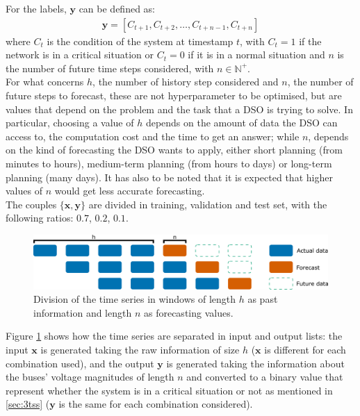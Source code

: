 \noindent For the labels, $\textbf{y}$ can be defined as: 
\begin{equation} \label{eq:labels}
    \begin{aligned}
        \textbf{y} = [C_{t+1},C_{t+2}, \dots, C_{t+n-1},C_{t+n}]
    \end{aligned}
\end{equation}
\noindent where $C_t$ is the condition of the system at timestamp $t$, with $C_t=1$ if the network is in a critical situation or $C_t=0$ if it is in a normal situation and $n$ is the number of future time steps considered, with $n \in \mathbb{N}^+$. \\

For what concerns $h$, the number of history step considered and $n$, the number of future steps to forecast, these are not hyperparameter to be optimised, but are values that depend on the problem and the task that a \gls{DSO} is trying to solve. In particular, choosing a value of $h$ depends on the amount of data the \gls{DSO} can access to, the computation cost and the time to get an answer; while $n$, depends on the kind of forecasting the \gls{DSO} wants to apply, either short planning (from minutes to hours), medium-term planning (from hours to days) or long-term planning (many days). It has also to be noted that it is expected that higher values of $n$ would get less accurate forecasting.\\

The couples $\{\textbf{x},\textbf{y}\}$ are divided in training, validation and test set, with the following ratios: $0.7$, $0.2$, $0.1$.

\begin{figure}[H]
\centering
    \includegraphics[width=0.9\linewidth]{images/MVOberr/Time Series Windowing.png}
\caption[Time series windowing]{Division of the time series in windows of length $h$ as past information and length $n$ as forecasting values.}
\label{fig:timewindow}
\end{figure}
\noindent Figure \ref{fig:timewindow} shows how the time series are separated in input and output lists: the input $\textbf{x}$ is generated taking the raw information of size $h$ ($\textbf{x}$ is different for each combination used), and the output $\textbf{y}$ is generated taking the information about the buses' voltage magnitudes of length $n$ and converted to a binary value that represent whether the system is in a critical situation or not as mentioned in \ref{sec:3tss} ($\textbf{y}$ is the same for each combination considered). \\

